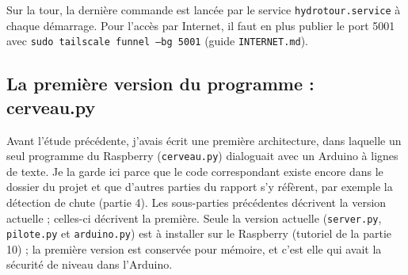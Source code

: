 Sur la tour, la dernière commande est lancée par le service \texttt{hydrotour.service} à chaque démarrage. Pour l'accès par Internet, il faut en plus publier le port 5001 avec \texttt{sudo tailscale funnel --bg 5001} (guide \texttt{INTERNET.md}).

\subsection{La première version du programme : cerveau.py}

Avant l'étude précédente, j'avais écrit une première architecture, dans laquelle un seul programme du Raspberry (\texttt{cerveau.py}) dialoguait avec un Arduino à lignes de texte. Je la garde ici parce que le code correspondant existe encore dans le dossier du projet et que d'autres parties du rapport s'y réfèrent, par exemple la détection de chute (partie 4). Les sous-parties précédentes décrivent la version actuelle ; celles-ci décrivent la première. Seule la version actuelle (\texttt{server.py}, \texttt{pilote.py} et \texttt{arduino.py}) est à installer sur le Raspberry (tutoriel de la partie 10) ; la première version est conservée pour mémoire, et c'est elle qui avait la sécurité de niveau dans l'Arduino.

